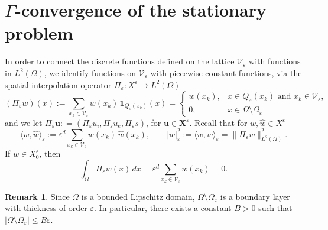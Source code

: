 \documentclass[a4paper,11pt]{article}
\theoremstyle{definition}
\newtheorem{remark}[theorem]{Remark}
\numberwithin{equation}{section}
\newcommand{\e}{\varepsilon}
\newcommand{\V}{\mathcal{V}}
\begin{document}
\section{$\Gamma$-convergence of the stationary problem}
In order to connect the discrete functions defined on the lattice $\V_\e$ with functions in $L^2(\Omega)$, we identify functions on $\V_\e$ with piecewise constant functions, via the spatial interpolation operator $\Pi_\e :X^\e \to L^2(\Omega)$
\begin{equation}
	\label{def:interpol}
	(\Pi_\e w)(x)
	:=
	\sum_{x_k\in \V_\e}
	w(x_k)\,\mathbf{1}_{Q_\e(x_k)}(x)=\begin{cases} 
		w(x_k), & x \in Q_\e(x_k) \,\,\text{and} \,\, x_k\in \V_\e, \\ 
		0, & x \in \Omega \setminus \Omega_\e
	\end{cases}
\end{equation}
and we let $\Pi_\e \mathbf u: = (\Pi_\e u_i,\Pi_\e u_e,\Pi_\e s)$, for $\mathbf u\in \mathbf{X}^\e$. Recall that for  $w,\widehat w\in X^\e$%
\begin{equation*}
	\langle w,\widehat w\rangle_\e
	:=\e^d\sum_{x_k\in\V_\e}w(x_k)\,\widehat w(x_k),
	\qquad
	|w|_\e^2:=\langle w,w\rangle_\e 	=
	\|\Pi_\e w\|_{L^2(\Omega)}^2.
\end{equation*}
If $w\in X_0^\e$, then
\begin{equation}
	\label{eq:zerodecomposition}
	\int_\Omega \Pi_\e w(x)\,dx
	=
	\e^d\sum_{x_k\in\V_\e} w(x_k)
	= 0.
\end{equation}

\begin{remark}
	\label{lemma:meanzero}
	Since $\Omega$ is a bounded Lipschitz domain, $\Omega \setminus \Omega_\e$ is a boundary layer with thickness of order $\e$. In particular, there exists a constant $B>0$ such that $|\Omega \setminus \Omega_\e| \le B\e$. 
\end{remark}
\end{document}
